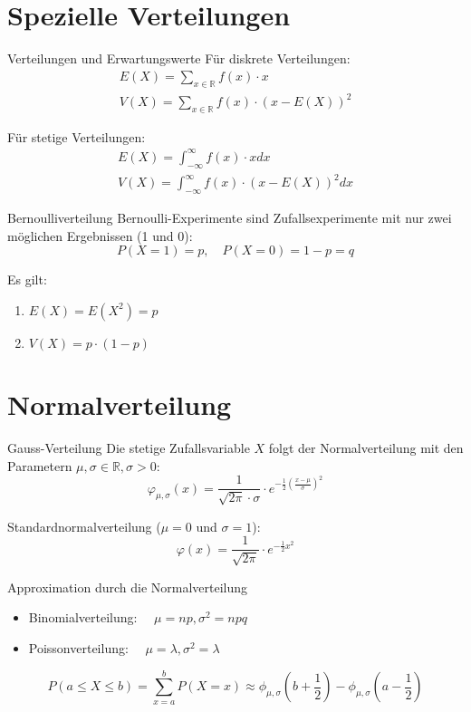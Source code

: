 \section{Spezielle Verteilungen}
\begin{definition}{Verteilungen und Erwartungswerte}
Für diskrete Verteilungen:
$$
\begin{gathered}
E(X)=\sum_{x \in \mathbb{R}} f(x) \cdot x \\
V(X)=\sum_{x \in \mathbb{R}} f(x) \cdot(x-E(X))^2
\end{gathered}
$$

Für stetige Verteilungen:
$$
\begin{gathered}
E(X)=\int_{-\infty}^{\infty} f(x) \cdot x dx \\
V(X)=\int_{-\infty}^{\infty} f(x) \cdot(x-E(X))^2 dx
\end{gathered}
$$
\end{definition}

\begin{definition}{Bernoulliverteilung}
Bernoulli-Experimente sind Zufallsexperimente mit nur zwei möglichen Ergebnissen (1 und 0):
$$
P(X=1)=p, \quad P(X=0)=1-p=q
$$

Es gilt:
\begin{enumerate}
  \item $E(X)=E(X^2)=p$
  \item $V(X)=p \cdot(1-p)$
\end{enumerate}
\end{definition}

\section{Normalverteilung}
\begin{definition}{Gauss-Verteilung}
Die stetige Zufallsvariable $X$ folgt der Normalverteilung mit den Parametern $\mu, \sigma \in \mathbb{R}, \sigma>0$:
$$
\varphi_{\mu,\sigma}(x)=\frac{1}{\sqrt{2\pi} \cdot \sigma} \cdot e^{-\frac{1}{2}(\frac{x-\mu}{\sigma})^2}
$$

Standardnormalverteilung ($\mu=0$ und $\sigma=1$):
$$
\varphi(x)=\frac{1}{\sqrt{2\pi}} \cdot e^{-\frac{1}{2}x^2}
$$
\end{definition}

\begin{theorem}{Approximation durch die Normalverteilung}
\begin{itemize}
  \item Binomialverteilung: $\quad \mu=np, \sigma^2=npq$
  \item Poissonverteilung: $\quad \mu=\lambda, \sigma^2=\lambda$
\end{itemize}

$$
P(a \leq X \leq b)=\sum_{x=a}^{b} P(X=x) \approx \phi_{\mu,\sigma}(b+\frac{1}{2})-\phi_{\mu,\sigma}(a-\frac{1}{2})
$$
\end{theorem}

